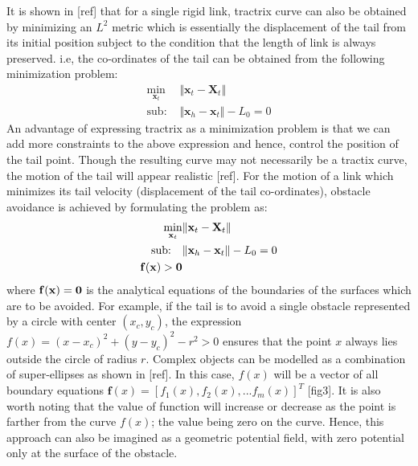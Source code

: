 \documentclass[11pt,a4paper]{article}
\begin{document}
It is shown in [ref] that for a single rigid link, tractrix curve can also be obtained by minimizing an $L^2$ metric which is essentially the displacement of the tail from its initial position subject to the condition that the length of link is always preserved. i.e, the co-ordinates of the tail can be obtained from the following minimization problem:
\begin{align}
\min_{\textbf{x}_t} &\Vert \textbf{x}_t-\textbf{X}_t \Vert\\
\text{sub:  } &\Vert \textbf{x}_h - \textbf{x}_t \Vert -L_0 = 0
\end{align}
An advantage of expressing tractrix as a minimization problem is that we can add more constraints to the above expression and hence, control the position of the tail point. Though the resulting curve may not necessarily be a tractix curve, the motion of the tail will appear realistic [ref]. For the motion of a link which minimizes its tail velocity (displacement of the tail co-ordinates), obstacle avoidance is achieved by formulating the problem as:
\begin{align}
\min_{\textbf{x}_t} &\Vert \textbf{x}_t-\textbf{X}_t \Vert\\
\text{sub:~~~} 
&\Vert \textbf{x}_h - \textbf{x}_t \Vert -L_0 = 0\\
\bf{f}(x) >0
\end{align}
where $\bf{f}(x) = 0$ is the analytical equations of the boundaries of the surfaces which are to be avoided. For example, if the tail is to avoid a single obstacle represented by a circle with center $(x_c,y_c)$, the expression $f(x) = (x-x_c)^2+(y-y_c)^2-r^2>0$ ensures that the point $x$ always lies outside the circle of radius $r$. Complex objects can be modelled as a combination of super-ellipses as shown in [ref]. In this case, $f(x)$ will be a vector of all boundary equations $\textbf{f}(x) = [f_1(x),f_2(x),...f_m(x)]^T$ [fig3]. It is also worth noting that the value of function will increase or decrease as the point is farther from the curve $f(x)$; the value being zero on the curve. Hence, this approach can also be imagined as a geometric potential field, with zero potential only at the surface of the obstacle. 
\end{document}
